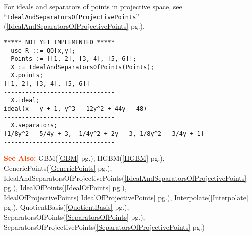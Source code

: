 \documentclass[a4paper]{mybook}
\newenvironment{command}{}{} %
\newcommand\SeeAlso{\par\textcolor{OrangeRed}{\textbf{\large See Also: }}}
\begin{document}
\begin{command}
For ideals and separators of points in projective space, see
``\verb&IdealAndSeparatorsOfProjectivePoints&'' (\ref{IdealAndSeparatorsOfProjectivePoints} pg.\pageref{IdealAndSeparatorsOfProjectivePoints}).
\begin{Verbatim}[label=example, rulecolor=\color{PineGreen}, frame=single]
***** NOT YET IMPLEMENTED *****
  use R ::= QQ[x,y];
  Points := [[1, 2], [3, 4], [5, 6]];
  X := IdealAndSeparatorsOfPoints(Points);
  X.points;
[[1, 2], [3, 4], [5, 6]]
-------------------------------
  X.ideal;
ideal(x - y + 1, y^3 - 12y^2 + 44y - 48)
-------------------------------
  X.separators;
[1/8y^2 - 5/4y + 3, -1/4y^2 + 2y - 3, 1/8y^2 - 3/4y + 1]
-------------------------------
\end{Verbatim}


\SeeAlso %
  GBM(\ref{GBM} pg.\pageref{GBM}), 
    HGBM(\ref{HGBM} pg.\pageref{HGBM}), 
    GenericPoints(\ref{GenericPoints} pg.\pageref{GenericPoints}), 
    IdealAndSeparatorsOfProjectivePoints(\ref{IdealAndSeparatorsOfProjectivePoints} pg.\pageref{IdealAndSeparatorsOfProjectivePoints}), 
    IdealOfPoints(\ref{IdealOfPoints} pg.\pageref{IdealOfPoints}), 
    IdealOfProjectivePoints(\ref{IdealOfProjectivePoints} pg.\pageref{IdealOfProjectivePoints}), 
    Interpolate(\ref{Interpolate} pg.\pageref{Interpolate}), 
    QuotientBasis(\ref{QuotientBasis} pg.\pageref{QuotientBasis}), 
    SeparatorsOfPoints(\ref{SeparatorsOfPoints} pg.\pageref{SeparatorsOfPoints}), 
    SeparatorsOfProjectivePoints(\ref{SeparatorsOfProjectivePoints} pg.\pageref{SeparatorsOfProjectivePoints})
\end{command} %
\end{document}
